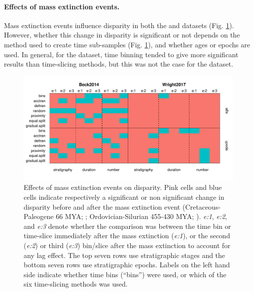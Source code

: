 \documentclass[12pt,a4paper]{article}
\begin{document}

\paragraph{Effects of mass extinction events.}
Mass extinction events influence disparity in both the \cite{beckancient2014} and \cite{wright2017bayesian} datasets (Fig. \ref{figure:extinction1}).
However, whether this change in disparity is significant or not depends on the method used to create time sub-samples (Fig. \ref{figure:extinction1}), and whether ages or epochs are used. 
In general, for the \cite{beckancient2014} dataset, time binning tended to give more significant results than time-slicing methods, but this was not the case for the \cite{wright2017bayesian} dataset.

\begin{figure}[!htbp]
    \centering
    \includegraphics[width=1\linewidth, height=1\textheight, keepaspectratio]{figures/fig-extinction-effect.pdf}
    \caption[Extinction example datasets.]
    {Effects of mass extinction events on disparity.
    Pink cells and blue cells indicate respectively a significant or non significant change in disparity before and after the mass extinction event (Cretaceous-Paleogene 66 MYA; \citealt{beckancient2014}; Ordovician-Silurian 455-430 MYA; \citealt{wright2017bayesian}).
    \textit{e:1}, \textit{e:2}, and \textit{e:3} denote whether the comparison was between the time bin or time-slice immediately after the mass extinction (\textit{e:1}), or the second (\textit{e:2}) or third (\textit{e:3}) bin/slice after the mass extinction to account for any lag effect.
    The top seven rows use stratigraphic stages and the bottom seven rows use stratigraphic epochs.
    Labels on the left hand side indicate whether time bins (``bins'') were used, or which of the six time-slicing methods was used.}
    \label{figure:extinction1}
\end{figure}
\end{document}
